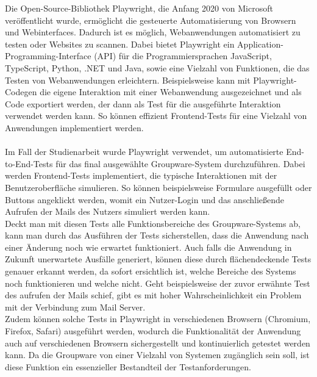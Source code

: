 Die Open-Source-Bibliothek Playwright, die Anfang 2020 von Microsoft veröffentlicht wurde, ermöglicht die gesteuerte Automatisierung von Browsern und Webinterfaces. Dadurch ist es möglich, Webanwendungen automatisiert zu testen oder Websites zu scannen.
Dabei bietet Playwright ein Application-Programming-Interface (API) für die Programmiersprachen JavaScript, TypeScript, Python, .NET und Java, sowie eine Vielzahl von Funktionen, die das Testen von Webanwendungen erleichtern.
Beispielsweise kann mit Playwright-Codegen die eigene Interaktion mit einer Webanwendung ausgezeichnet und als Code exportiert werden, der dann als Test für die ausgeführte Interaktion verwendet werden kann.
So können effizient Frontend-Tests für eine Vielzahl von Anwendungen implementiert werden.
\autocite[Quelle:][]{playwright}
\\
\\
Im Fall der Studienarbeit wurde Playwright verwendet, um automatisierte End-to-End-Tests für das final ausgewählte Groupware-System durchzuführen.
Dabei werden Frontend-Tests implementiert, die typische Interaktionen mit der Benutzeroberfläche simulieren.
So können beispielsweise Formulare ausgefüllt oder Buttons angeklickt werden, womit ein Nutzer-Login und das anschließende Aufrufen der Mails des Nutzers simuliert werden kann.
\\
Deckt man mit diesen Tests alle Funktionsbereiche des Groupware-Systems ab, kann man durch das Ausführen der Tests sicherstellen, dass die Anwendung nach einer Änderung noch wie erwartet funktioniert.
Auch falls die Anwendung in Zukunft unerwartete Ausfälle generiert, können diese durch flächendeckende Tests genauer erkannt werden, da sofort ersichtlich ist, welche Bereiche des Systems noch funktionieren und welche nicht.
Geht beispielsweise der zuvor erwähnte Test des aufrufen der Mails schief, gibt es mit hoher Wahrscheinlichkeit ein Problem mit der Verbindung zum Mail Server.
\\
Zudem können solche Tests in Playwright in verschiedenen Browsern (Chromium, Firefox, Safari) ausgeführt werden, wodurch die Funktionalität der Anwendung auch auf verschiedenen Browsern sichergestellt und kontinuierlich getestet werden kann.
Da die Groupware von einer Vielzahl von Systemen zugänglich sein soll, ist diese Funktion ein essenzieller Bestandteil der Testanforderungen.








